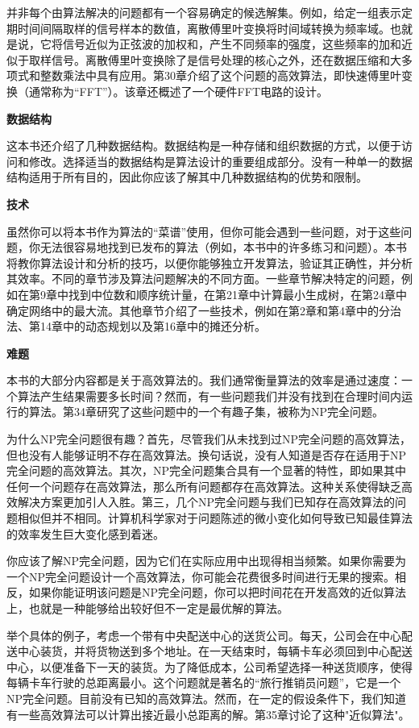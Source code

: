 \documentclass[lang=cn,newtx,10pt,scheme=chinese]{elegantbook}
\begin{document}
并非每个由算法解决的问题都有一个容易确定的候选解集。例如，给定一组表示定期时间间隔取样的信号样本的数值，离散傅里叶变换将时间域转换为频率域。也就是说，它将信号近似为正弦波的加权和，产生不同频率的强度，这些频率的加和近似于取样信号。离散傅里叶变换除了是信号处理的核心之外，还在数据压缩和大多项式和整数乘法中具有应用。第30章介绍了这个问题的高效算法，即快速傅里叶变换（通常称为``FFT''）。该章还概述了一个硬件FFT电路的设计。

\textbf{数据结构}

这本书还介绍了几种数据结构。数据结构是一种存储和组织数据的方式，以便于访问和修改。选择适当的数据结构是算法设计的重要组成部分。没有一种单一的数据结构适用于所有目的，因此你应该了解其中几种数据结构的优势和限制。

\textbf{技术}

虽然你可以将本书作为算法的``菜谱''使用，但你可能会遇到一些问题，对于这些问题，你无法很容易地找到已发布的算法（例如，本书中的许多练习和问题）。本书将教你算法设计和分析的技巧，以便你能够独立开发算法，验证其正确性，并分析其效率。不同的章节涉及算法问题解决的不同方面。一些章节解决特定的问题，例如在第9章中找到中位数和顺序统计量，在第21章中计算最小生成树，在第24章中确定网络中的最大流。其他章节介绍了一些技术，例如在第2章和第4章中的分治法、第14章中的动态规划以及第16章中的摊还分析。

\textbf{难题}

本书的大部分内容都是关于高效算法的。我们通常衡量算法的效率是通过速度：一个算法产生结果需要多长时间？然而，有一些问题我们并没有找到在合理时间内运行的算法。第34章研究了这些问题中的一个有趣子集，被称为NP完全问题。

为什么NP完全问题很有趣？首先，尽管我们从未找到过NP完全问题的高效算法，但也没有人能够证明不存在高效算法。换句话说，没有人知道是否存在适用于NP完全问题的高效算法。其次，NP完全问题集合具有一个显著的特性，即如果其中任何一个问题存在高效算法，那么所有问题都存在高效算法。这种关系使得缺乏高效解决方案更加引人入胜。第三，几个NP完全问题与我们已知存在高效算法的问题相似但并不相同。计算机科学家对于问题陈述的微小变化如何导致已知最佳算法的效率发生巨大变化感到着迷。

你应该了解NP完全问题，因为它们在实际应用中出现得相当频繁。如果你需要为一个NP完全问题设计一个高效算法，你可能会花费很多时间进行无果的搜索。相反，如果你能证明该问题是NP完全问题，你可以把时间花在开发高效的近似算法上，也就是一种能够给出较好但不一定是最优解的算法。

举个具体的例子，考虑一个带有中央配送中心的送货公司。每天，公司会在中心配送中心装货，并将货物送到多个地址。在一天结束时，每辆卡车必须回到中心配送中心，以便准备下一天的装货。为了降低成本，公司希望选择一种送货顺序，使得每辆卡车行驶的总距离最小。这个问题就是著名的``旅行推销员问题''，它是一个NP完全问题。目前没有已知的高效算法。然而，在一定的假设条件下，我们知道有一些高效算法可以计算出接近最小总距离的解。第35章讨论了这种"近似算法"。
\end{document}

